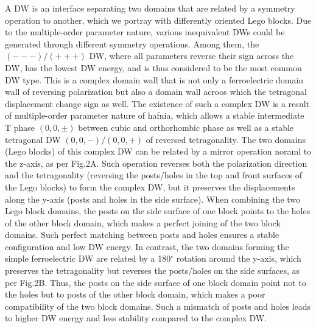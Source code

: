 \documentclass[12pt]{article}
\begin{document}
A DW is an interface separating two domains that are related by a symmetry operation to another, which we portray with differently oriented Lego blocks.
Due to the multiple-order parameter nature, various inequivalent DWs could be generated through different symmetry operations. 
Among them, the $(---)/(+++)$ DW, where all parameters reverse their sign across the DW, has the lowest DW energy, and is thus considered to be the most common DW type. 
This is a complex domain wall that is not only a ferroelectric domain wall of reversing polarization but also a domain wall acroos which the tetragonal displacement change sign as well.
The existence of such a complex DW is a result of multiple-order parameter nature of hafnia, which allows a stable intermediate T phase $(0,0,\pm)$ between cubic and orthorhombic phase as well as a stable tetragonal DW $(0,0,-)/(0,0,+)$ of reversed tetragonality.
The two domains (Lego blocks) of this complex DW can be related by a mirror operation noraml to the z-axis, as per Fig.2A. 
Such operation reverses both the polarization direction and the tetragonality (reversing the posts/holes in the top and front surfaces of the Lego blocks) to form the complex DW, but it preserves the displacements along the y-axis (posts and holes in the side surface). 
When combining the two Lego block domains, the posts on the side surface of one block points to the holes of the other block domain, which makes a perfect joining of the two block domains.
Such perfect matching between posts and holes ensures a stable configuration and low DW energy.
In contrast, the two domains forming the simple ferroelectric DW are related by a 180$^\circ$ rotation around the y-axis, which preserves the tetragonality but reverses the posts/holes on the side surfaces, as per Fig.2B. 
Thus, the posts on the side surface of one block domain point not to the holes but to posts of the other block domain, which makes a poor compatibility of the two block domains.
Such a mismatch of posts and holes leads to higher DW energy and less stability compared to the complex DW. 
\end{document}
